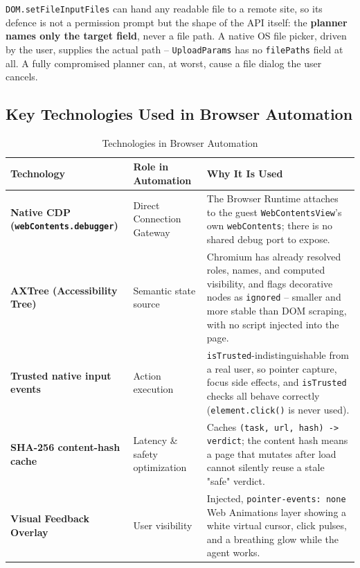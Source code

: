 \documentclass[11pt,a4paper]{article}
\begin{document}
\begin{tcolorbox}[title=Upload is structural, not procedural]
\texttt{DOM.setFileInputFiles} can hand any readable file to a remote site, so its defence is not a permission prompt but the shape of the API itself: the \textbf{planner names only the target field}, never a file path. A native OS file picker, driven by the user, supplies the actual path -- \texttt{UploadParams} has no \texttt{filePaths} field at all. A fully compromised planner can, at worst, cause a file dialog the user cancels.
\end{tcolorbox}

\subsection{Key Technologies Used in Browser Automation}

\begin{table}[H]
\centering
\small
\begin{tabularx}{\textwidth}{BXX}
\toprule
\textbf{Technology} & \textbf{Role in Automation} & \textbf{Why It Is Used} \\
\midrule
\textbf{Native CDP (\texttt{webContents.debugger})} & Direct Connection Gateway & The Browser Runtime attaches to the guest \texttt{WebContentsView}'s own \texttt{webContents}; there is no shared debug port to expose. \\
\textbf{AXTree (Accessibility Tree)} & Semantic state source & Chromium has already resolved roles, names, and computed visibility, and flags decorative nodes as \texttt{ignored} -- smaller and more stable than DOM scraping, with no script injected into the page. \\
\textbf{Trusted native input events} & Action execution & \texttt{isTrusted}-indistinguishable from a real user, so pointer capture, focus side effects, and \texttt{isTrusted} checks all behave correctly (\texttt{element.click()} is never used). \\
\textbf{SHA-256 content-hash cache} & Latency \& safety optimization & Caches \texttt{(task, url, hash) -> verdict}; the content hash means a page that mutates after load cannot silently reuse a stale "safe" verdict. \\
\textbf{Visual Feedback Overlay} & User visibility & Injected, \texttt{pointer-events: none} Web Animations layer showing a white virtual cursor, click pulses, and a breathing glow while the agent works. \\
\bottomrule
\end{tabularx}
\caption{Technologies in Browser Automation}
\end{table}
\end{document}
